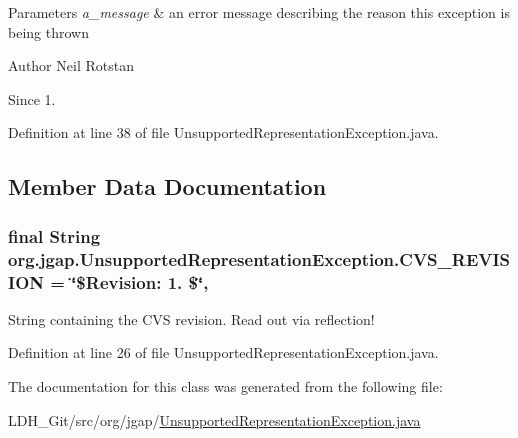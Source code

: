 \begin{DoxyParams}{Parameters}
{\em a\-\_\-message} & an error message describing the reason this exception is being thrown\\
\hline
\end{DoxyParams}
\begin{DoxyAuthor}{Author}
Neil Rotstan 
\end{DoxyAuthor}
\begin{DoxySince}{Since}
1. 
\end{DoxySince}


Definition at line 38 of file Unsupported\-Representation\-Exception.\-java.



\subsection{Member Data Documentation}
\hypertarget{classorg_1_1jgap_1_1_unsupported_representation_exception_a2415a1c667a190751c6ddee6375e5bc5}{
\subsubsection[{C\-V\-S\-\_\-\-R\-E\-V\-I\-S\-I\-O\-N}]{\setlength{\rightskip}{0pt plus 5cm}final String org.\-jgap.\-Unsupported\-Representation\-Exception.\-C\-V\-S\-\_\-\-R\-E\-V\-I\-S\-I\-O\-N = \char`\"{}\$Revision\-: 1. \$\char`\"{}\hspace{0.3cm}{\ttfamily [static]}, {\ttfamily [private]}}}\label{classorg_1_1jgap_1_1_unsupported_representation_exception_a2415a1c667a190751c6ddee6375e5bc5}
String containing the C\-V\-S revision. Read out via reflection! 

Definition at line 26 of file Unsupported\-Representation\-Exception.\-java.



The documentation for this class was generated from the following file\-:\begin{DoxyCompactItemize}
\item 
L\-D\-H\-\_\-\-Git/src/org/jgap/\hyperlink{_unsupported_representation_exception_8java}{Unsupported\-Representation\-Exception.\-java}\end{DoxyCompactItemize}

